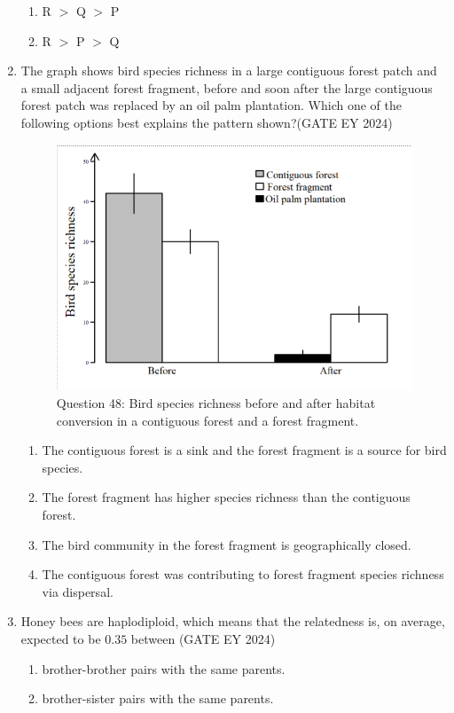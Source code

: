 \begin{enumerate}
\begin{enumerate}
        \item R $>$ Q $>$ P
        \item R $>$ P $>$ Q
    \end{enumerate}
\item The graph shows bird species richness in a large contiguous forest patch and a small adjacent forest fragment, before and soon after the large contiguous forest patch was replaced by an oil palm plantation. Which one of the following options best explains the pattern shown?\hfill{(GATE EY 2024)}
\begin{figure}[!ht]
    \centering
    \includegraphics[width=0.8\columnwidth]{figs/Q-48.png}
    \caption{Question 48: Bird species richness before and after habitat conversion in a contiguous forest and a forest fragment.}
    \label{Q.48}
\end{figure}
    \begin{enumerate}
        \item The contiguous forest is a sink and the forest fragment is a source for bird species.
        \item The forest fragment has higher species richness than the contiguous forest.
        \item The bird community in the forest fragment is geographically closed.
        \item The contiguous forest was contributing to forest fragment species richness via dispersal.
    \end{enumerate}
\item Honey bees are haplodiploid, which means that the relatedness is, on average, expected to be $0.35$ between \hfill{(GATE EY 2024)}
    \begin{enumerate}
        \item brother-brother pairs with the same parents.
        \item brother-sister pairs with the same parents.

\end{enumerate}
\end{enumerate}
